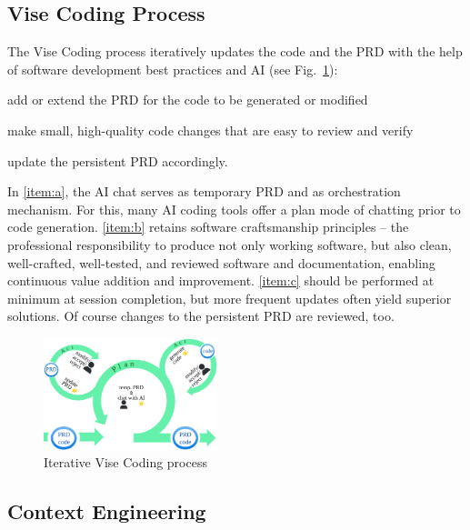 \documentclass[twocolumn]{article}
\begin{document}
\subsection{Vise Coding Process}

The Vise Coding process iteratively updates the code and the PRD with the help of software development best practices and AI (see Fig.~\ref{fig:process}):
\begin{compactenum}[(a)]
\item add or extend the PRD for the code to be generated or modified\label{item:a} 
\item make small, high-quality code changes that are easy to review and verify\label{item:b}
\item update the persistent PRD accordingly.\label{item:c}
\end{compactenum}

In \ref{item:a}, the AI chat serves as temporary PRD and as orchestration mechanism.
For this, many AI coding tools offer a plan mode of chatting prior to code generation. 
\ref{item:b} retains software craftsmanship principles -- the professional responsibility to produce not only working software,
but also clean, well-crafted, well-tested, and reviewed software and documentation,
enabling continuous value addition and improvement.
\ref{item:c} should be performed at minimum at session completion,
but more frequent updates often yield superior solutions.
Of course changes to the persistent PRD are reviewed, too.

\begin{figure}[hbt!]
  \begin{center}
  \vspace{-4mm}
  \includegraphics[width=0.45\textwidth]{figures/vise_process_v2}
  \vspace{-4mm}
\caption{Iterative Vise Coding process}
\label{fig:process}
\end{center}
\end{figure}

\subsection{Context Engineering}
\end{document}
